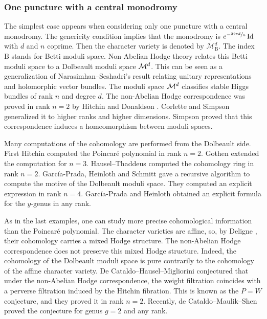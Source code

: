 \documentclass[11pt]{article}
\newcommand{\NoChangel}[1]{%
\expandafter\let\csname old\string#1\endcsname=#1
\let#1=\relax
\newcommand{#1}{\mathcode`l="716C\csname old\string#1\endcsname\mathcode`l="7160 }%
}
\newcommand{\Dol}{\mathrm{Dol}}\NoChangel{\Dol}
\newcommand{\rB}{\mathrm{B}}
\theoremstyle{definition}
\theoremstyle{plain}
\DeclareMathOperator{\Id}{Id}
\begin{document}
\subsubsection{One puncture with a central monodromy}
The simplest case appears when considering only one puncture with a central monodromy. The genericity condition implies that the monodromy is $e^{-\sfrac{2 i \pi d}{n}} \Id$ with $d$ and $n$ coprime. Then the character variety is denoted by $\mathcal{M}_{\rB}^d$. The index $\rB$ stands for Betti moduli space. Non-Abelian Hodge theory relates this Betti moduli space to a Dolbeault moduli space $\mathcal{M}^d_{\Dol}$. This can be seen as a generalization of Narasimhan--Seshadri's result \cite{Narasimhan_Seshadri} relating unitary representations and holomorphic vector bundles. The moduli space $\mathcal{M}^d_{\Dol}$ classifies stable Higgs bundles of rank $n$ and degree $d$. The non-Abelian Hodge correspondence was proved in rank $n=2$ by Hitchin \cite{Hitchin87} and Donaldson \cite{Donaldson}. Corlette \cite{Corlette} and Simpson \cite{Simpson_88,Simpson1992HiggsBA} generalized it to higher ranks and higher dimensions. Simpson \cite{Simpson_94_I,Simpson_94_II} proved that this correspondence induces a homeomorphism between moduli spaces.

Many computations of the cohomology are performed from the Dolbeault side. First Hitchin \cite{Hitchin87} computed the Poincaré polynomial in rank $n=2$. Gothen \cite{Gothen} extended the computation for $n=3$. Hausel--Thaddeus \cite{Hausel_Thaddeus_03,Hausel_Thaddeus_2004} computed the cohomology ring in rank $n=2$. García-Prada, Heinloth and Schmitt \cite{Garcia_Heinloth_Schmitt} gave a recursive algorithm to compute the motive of the Dolbeault moduli space. They computed an explicit expression in rank $n=4$. García-Prada and Heinloth \cite{Garcia_Prada_Heinloth_y_genus} obtained an explicit formula for the $y$-genus in any rank.

As in the last examples, one can study more precise cohomological information than the Poincaré polynomial. The character varieties are affine, so, by Deligne \cite{Deligne_Hodge}, their cohomology carries a mixed Hodge structure. The non-Abelian Hodge correspondence does not preserve this mixed Hodge structure. Indeed, the cohomology of the Dolbeault moduli space is pure contrarily to the cohomology of the affine character variety. De Cataldo--Hausel--Migliorini \cite{de_Cataldo_Hausel_Migliorini_PW} conjectured that under the non-Abelian Hodge correspondence, the weight filtration coincides with a perverse filtration induced by the Hitchin fibration. This is known as the $P=W$ conjecture, and they proved it in rank $n=2$. Recently, de Cataldo--Maulik--Shen \cite{deCataldo_Maulik_Shen} proved the conjecture for genus $g=2$ and any rank.
\end{document}

